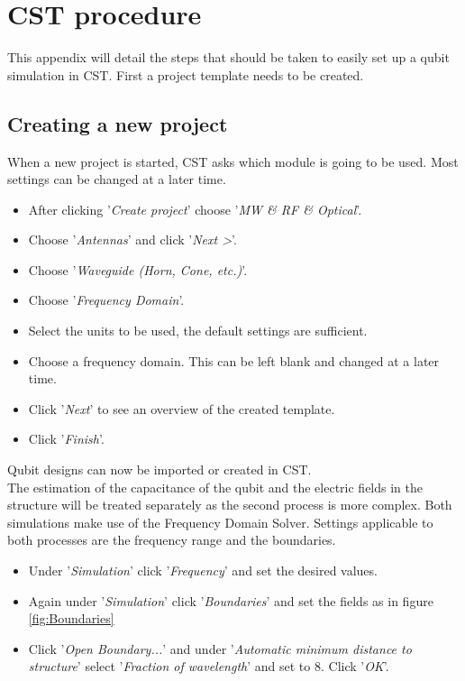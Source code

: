 \chapter{CST procedure}
\label{appendix:CST_procedure}
This appendix will detail the steps that should be taken to easily set up a qubit simulation in CST. First a project template needs to be created.
\section{Creating a new project}
 When a new project is started, CST asks which module is going to be used. Most settings can be changed at a later time.
 \begin{itemize}
 	\item After clicking '\textit{Create project}' choose '\textit{MW \& RF \& Optical}'.
 	\item Choose '\textit{Antennas}' and click '\textit{Next >}'.
 	\item Choose '\textit{Waveguide (Horn, Cone, etc.)}'.
 	\item Choose '\textit{Frequency Domain}'.
 	\item Select the units to be used, the default settings are sufficient.
 	\item Choose a frequency domain. This can be left blank and changed at a later time.
 	\item Click '\textit{Next}' to see an overview of the created template.
 	\item Click '\textit{Finish}'. 
 \end{itemize}
Qubit designs can now be imported or created in CST.\\

The estimation of the capacitance of the qubit and the electric fields in the structure will be treated separately as the second process is more complex. Both simulations make use of the Frequency Domain Solver. Settings applicable to both processes are the frequency range and the boundaries. 
\begin{itemize}
	\item Under '\textit{Simulation}' click '\textit{Frequency}' and set the desired values.
	\item Again under '\textit{Simulation}' click '\textit{Boundaries}' and set the fields as in figure \ref{fig:Boundaries}
	\item Click '\textit{Open Boundary...}' and under '\textit{Automatic minimum distance to structure}' select '\textit{Fraction of wavelength}' and set to 8. Click '\textit{OK}'.
\end{itemize}

